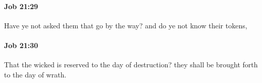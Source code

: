 		\paragraph{Job 21:29} %
			\label{JOB-21-29}

			Have ye not asked them that go by the way? and do ye not know their tokens,


		\paragraph{Job 21:30} %
			\label{JOB-21-30}

			That the wicked is reserved to the day of destruction? they shall be brought forth to the day of wrath.


